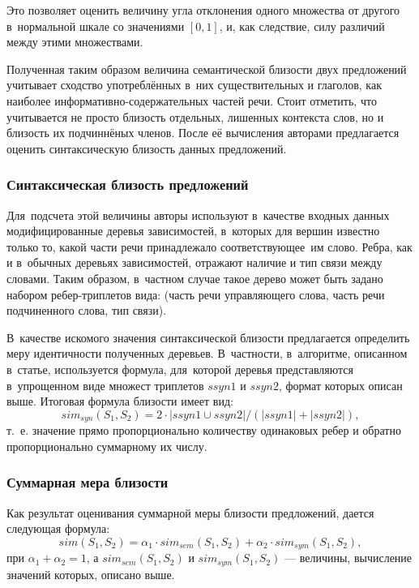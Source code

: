 Это позволяет оценить величину угла отклонения одного множества от другого в~нормальной шкале
со значениями $[0,1]$, и, как следствие,
 силу различий между этими множествами.

Полученная таким образом величина семантической близости двух предложений
учитывает сходство употреблённых в~них существительных и глаголов,
как наиболее информативно-содержательных частей речи. 
Стоит отметить, что учитывается не просто близость
отдельных, лишенных контекста слов, но и близость их подчиннёных членов. 
После её вычисления авторами предлагается оценить
синтаксическую близость данных предложений.

\subsubsection{Синтаксическая близость предложений}
\label{sec:syntactic_similarity}

Для~подсчета этой величины авторы используют в~качестве входных данных
модифицированные деревья зависимостей, в~которых для вершин известно только то, 
какой части речи принадлежало соответствующее~им слово.
Ребра, как и в~обычных деревьях зависимостей, отражают
наличие и тип связи между словами.
Таким образом, в~частном случае такое дерево может быть задано
набором ребер-триплетов вида:
(часть речи управляющего слова, часть речи подчиненного слова, тип связи).

В~качестве искомого значения синтаксической близости предлагается определить меру идентичности полученных деревьев. 
В~частности, в~алгоритме, описанном в~статье,
используется формула, для~которой деревья представляются в~упрощенном виде
множест триплетов $ssyn1$ и $ssyn2$, формат которых описан выше.
Итоговая формула близости имеет вид: 
$$sim_{syn}(S_1, S_2) = 2 \cdot |ssyn1 \cup ssyn2| / (|ssyn1| + |ssyn2|),$$ 
т.~е. значение прямо пропорционально количеству одинаковых ребер
и обратно пропорционально суммарному их числу.

\subsubsection{Суммарная мера близости}

Как результат оценивания суммарной меры близости предложений, 
дается следующая формула:
$$sim(S_1, S_2) = \alpha_1 \cdot sim_{sem}(S_1, S_2) + \alpha_2 \cdot sim_{sym}(S_1, S_2),$$
 при $\alpha_1+\alpha_2=1$,
а $sim_{sem}(S_1, S_2)$ и 
$sim_{sym}(S_1, S_2)$ --- величины, вычисление значений которых, описано выше.

